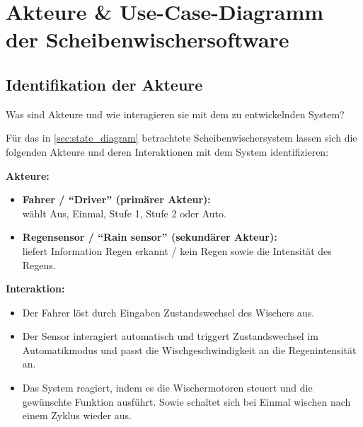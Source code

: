 \documentclass[
%
ngerman %
%
numeric %
]{wbh-assignment}
\begin{document}
\clearpage

\section{Akteure \& Use-Case-Diagramm der Scheibenwischersoftware}

\subsection{Identifikation der Akteure}
\begin{aufgabenstellung}
Was sind Akteure und wie interagieren sie mit dem zu entwickelnden System?
\end{aufgabenstellung}

\vspace*{5mm}

Für das in \autoref{sec:state_diagram} betrachtete Scheibenwischersystem lassen sich die folgenden Akteure und deren Interaktionen mit dem System identifizieren:

\textbf{Akteure:}
\begin{itemize}
  \item \textbf{Fahrer / \enquote{Driver} (primärer Akteur):} \\
        wählt \glqq Aus\grqq, \glqq Einmal\grqq, \glqq Stufe 1\grqq, \glqq Stufe 2\grqq{} oder \glqq Auto\grqq.
  \item \textbf{Regensensor / \enquote{Rain sensor} (sekundärer Akteur):} \\
        liefert Information \glqq Regen erkannt / kein Regen\grqq{} sowie die \glqq Intensität des Regens\grqq.
\end{itemize}

\vspace*{5mm}

\textbf{Interaktion:}
\begin{itemize}
  \item Der Fahrer löst durch Eingaben Zustandswechsel des Wischers aus.
  \item Der Sensor interagiert automatisch und triggert Zustandswechsel im Automatikmodus und passt die Wischgeschwindigkeit an die Regenintensität an.
  \item Das System reagiert, indem es die Wischermotoren steuert und die gewünschte Funktion ausführt. Sowie schaltet sich bei \glqq Einmal wischen\grqq{} nach einem Zyklus wieder aus.
\end{itemize}
\end{document}
